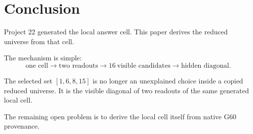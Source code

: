 \section{Conclusion}

Project 22 generated the local answer cell.  This paper derives the reduced universe from that cell.

The mechanism is simple:
\[
    \text{one cell}
    \longrightarrow
    \text{two readouts}
    \longrightarrow
    16\ \text{visible candidates}
    \longrightarrow
    \text{hidden diagonal}.
\]

The selected set \([1,6,8,15]\) is no longer an unexplained choice inside a copied reduced universe.  It is the visible diagonal of two readouts of the same generated local cell.

The remaining open problem is to derive the local cell itself from native G60 provenance.
